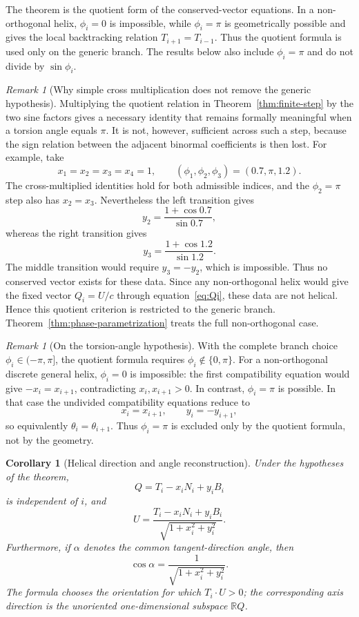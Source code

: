 \documentclass[10pt,a4paper]{amsart}
\newtheorem{corollary}[theorem]{Corollary}
\theoremstyle{definition}
\theoremstyle{remark}
\newtheorem{remark}[theorem]{Remark}
\numberwithin{equation}{section}
\begin{document}
The theorem is the quotient form of the conserved-vector equations. In a non-orthogonal helix, $\phi_i=0$ is impossible, while $\phi_i=\pi$ is geometrically possible and gives the local backtracking relation $T_{i+1}=T_{i-1}$. Thus the quotient formula is used only on the generic branch. The results below also include $\phi_i=\pi$ and do not divide by $\sin\phi_i$.

\begin{remark}[Why simple cross multiplication does not remove the generic hypothesis]\label{rem:cross-multiplication}
Multiplying the quotient relation in Theorem~\ref{thm:finite-step} by the two sine factors gives a necessary identity that remains formally meaningful when a torsion angle equals $\pi$.  It is not, however, sufficient across such a step, because the sign relation between the adjacent binormal coefficients is then lost.  For example, take
\[
x_1=x_2=x_3=x_4=1,
\qquad
(\phi_1,\phi_2,\phi_3)=(0.7,\pi,1.2).
\]
The cross-multiplied identities hold for both admissible indices, and the $\phi_2=\pi$ step also has $x_2=x_3$.  Nevertheless the left transition gives
\[
y_2=\frac{1+\cos0.7}{\sin0.7},
\]
whereas the right transition gives
\[
y_3=\frac{1+\cos1.2}{\sin1.2}.
\]
The middle transition would require $y_3=-y_2$, which is impossible.  Thus no conserved vector exists for these data. Since any non-orthogonal helix would give the fixed vector $Q_i=U/c$ through equation~\eqref{eq:Qi}, these data are not helical. Hence this quotient criterion is restricted to the generic branch. Theorem~\ref{thm:phase-parametrization} treats the full non-orthogonal case.
\end{remark}

\begin{remark}[On the torsion-angle hypothesis]\label{rem:torsion-hypothesis}
With the complete branch choice $\phi_i\in(-\pi,\pi]$, the quotient formula requires $\phi_i\notin\{0,\pi\}$.  For a non-orthogonal discrete general helix, $\phi_i=0$ is impossible: the first compatibility equation would give $-x_i=x_{i+1}$, contradicting $x_i,x_{i+1}>0$.  In contrast, $\phi_i=\pi$ is possible.  In that case the undivided compatibility equations reduce to
\[
x_i=x_{i+1},\qquad y_i=-y_{i+1},
\]
so equivalently $\theta_i=\theta_{i+1}$.  Thus $\phi_i=\pi$ is excluded only by the quotient formula, not by the geometry.
\end{remark}

\begin{corollary}[Helical direction and angle reconstruction]\label{cor:axis-reconstruction}
Under the hypotheses of the theorem,
\[
Q=T_i-x_iN_i+y_iB_i
\]
is independent of \(i\), and
\[
\boxed{
U=
\frac{T_i-x_iN_i+y_iB_i}
{\sqrt{1+x_i^2+y_i^2}}
}.
\]
Furthermore, if \(\alpha\) denotes the common tangent-direction angle, then
\[
\boxed{
\cos\alpha=\frac1{\sqrt{1+x_i^2+y_i^2}}.
}
\]
The formula chooses the orientation for which $T_i\cdot U>0$; the corresponding axis direction is the unoriented one-dimensional subspace $\mathbb RQ$.
\end{corollary}
\end{document}
